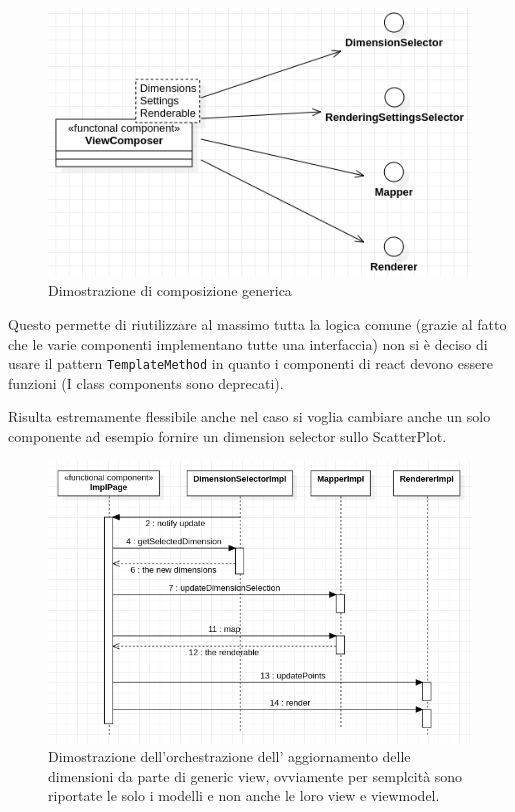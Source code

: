 \begin{figure}[h!]
  \centering
  \includegraphics[scale=0.55]{../../assets/classi_uml/comdelcomposer.png}
  \caption{Dimostrazione di composizione generica}
\end{figure}

Questo permette di riutilizzare al massimo tutta la logica comune (grazie al fatto
che le varie componenti implementano tutte una interfaccia) non si è deciso di usare
il pattern \texttt{TemplateMethod} in quanto i componenti di react devono essere
funzioni (I class components sono deprecati).

Risulta estremamente flessibile anche nel caso si voglia cambiare anche un solo
componente ad esempio fornire un dimension selector sullo ScatterPlot.

\begin{figure}[h!]
  \centering
  \includegraphics[scale=0.55]{../../assets/classi_uml/interazione_gw.png}
  \caption{Dimostrazione dell'orchestrazione dell' aggiornamento delle
    dimensioni da parte di generic view, ovviamente per semplcità sono riportate
    le solo i modelli e non anche le loro view e viewmodel.}
\end{figure}

